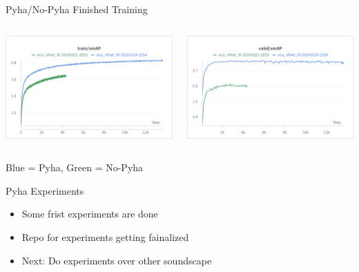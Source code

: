 
\begin{frame}{Pyha/No-Pyha Finished Training}
    \begin{columns}
        \begin{column}{0.5\textwidth}
            \centering
            \includegraphics[height=0.5\textwidth]{images/train-smap-pnp.png}
        \end{column}
        \begin{column}{0.5\textwidth}
            \centering
            \includegraphics[height=0.5\textwidth]{images/valid-smap-pnp.png}
        \end{column}
    \end{columns}
    \centering
    Blue = Pyha, Green = No-Pyha
\end{frame}

\begin{frame}{Pyha Experiments}
    \begin{itemize}
        \item Some frist experiments are done
        \item Repo for experiments getting fainalized
        \item Next: Do experiments over other soundscape
    \end{itemize}    
\end{frame}


